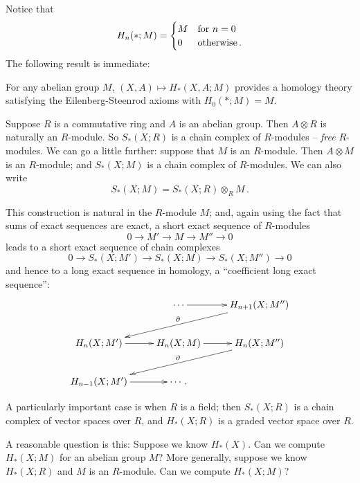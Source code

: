 Notice that
\[
H_n(\ast;M)=
\begin{cases}M & \hbox{for}\,\, n=0\\0 & \hbox{otherwise}\,.\end{cases}
\]
The following result is immediate: 
\begin{prop}
For any abelian group $M$, $(X,A)\mapsto H_*(X,A;M)$ provides a homology 
theory satisfying the Eilenberg-Steenrod axioms with $H_0(\ast;M)=M$.
\end{prop}

Suppose $R$ is a commutative ring and $A$ is an abelian group. Then $A\otimes R$ is naturally an $R$-module. So $S_*(X;R)$ is a chain complex of $R$-modules -- {\em free} $R$-modules. We can go a little further: suppose that $M$ is an $R$-module. Then $A\otimes M$ is an $R$-module; and $S_*(X;M)$ is a chain complex of $R$-modules. We can also write 
\[
S_*(X;M)=S_*(X;R)\otimes_RM\,.
\]

This construction is natural in the $R$-module $M$; and, again using the fact
that sums of exact sequences are exact, a short exact sequence
of $R$-modules
\[
0\to M'\to M\to M''\to 0
\]
leads to a short exact sequence of chain complexes
\[
0\to S_*(X;M')\to S_*(X;M)\to S_*(X;M'')\to0
\]
and hence to a long exact sequence in homology, a ``coefficient long exact
sequence'':
\[
\xymatrix{ 
& \cdots \ar[r] & H_{n+1}(X;M'') \ar[dll]_\partial \\
H_n(X;M') \ar[r] & H_n(X;M) \ar[r] & H_n(X;M'') \ar[dll]_\partial \\
H_{n-1}(X;M') \ar[r] & \cdots\,.
}\]

A particularly important case is when $R$ is a field; then $S_*(X;R)$ is a 
chain complex of vector spaces over $R$, and $H_*(X;R)$ is a graded vector
space over $R$.

\begin{question}
A reasonable question is this: Suppose we know $H_*(X)$. Can we compute 
$H_*(X;M)$ for an abelian group $M$? More generally, suppose we know $H_*(X;R)$ and $M$ is an $R$-module. Can we compute $H_*(X;M)$?
\end{question}

